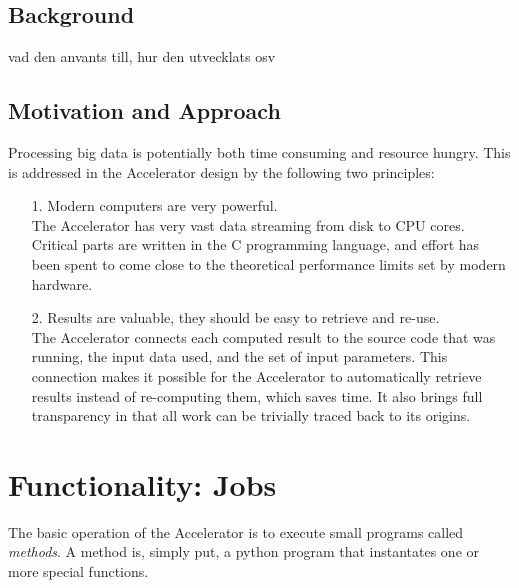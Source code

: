 \documentclass[a4paper]{article}
\begin{document}
\subsection*{Background}
vad den anvants till, hur den utvecklats osv

\subsection*{Motivation and Approach}
Processing big data is potentially both time consuming and resource
hungry.  This is addressed in the Accelerator design by the following
two principles:
\begin{itemize}
\item[1.] Modern computers are very powerful.\\ The Accelerator has
  very vast data streaming from disk to CPU cores.  Critical parts are
  written in the C programming language, and effort has been spent to
  come close to the theoretical performance limits set by modern
  hardware.
  
\item[2.] Results are valuable, they should be easy to retrieve and
  re-use.\\ The Accelerator connects each computed result to the
  source code that was running, the input data used, and the set of
  input parameters.  This connection makes it possible for the
  Accelerator to automatically retrieve results instead of
  re-computing them, which saves time.  It also brings full
  transparency in that all work can be trivially traced back to its
  origins.
\end{itemize}



















\clearpage
\section{Functionality: Jobs}
The basic operation of the Accelerator is to execute small programs
called \textsl{methods}.  A method is, simply put, a python program
that instantates one or more special functions.
\end{document}
